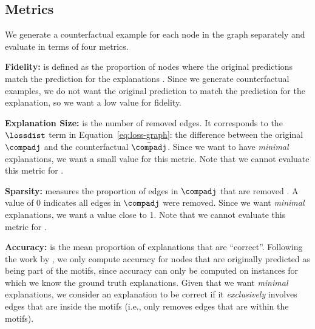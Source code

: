 \subsection{Metrics}
\label{section:cfgnn-metrics}
We generate a counterfactual example for each node in the graph separately and evaluate in terms of four metrics.

\medskip \noindent
\textbf{Fidelity:} is defined as the proportion of nodes where the original predictions match the prediction for the explanations \citep{molnar2019,ribeiro-2016-should}. Since we generate counterfactual examples, we do not want the original prediction to match the prediction for the explanation, so we want a low value for fidelity. 

\medskip \noindent
\textbf{Explanation Size:} is the number of removed edges. It corresponds to the $\lossdist$ term in Equation~\ref{eq:loss-graph}: the difference between the original $\compadj$ and the counterfactual $\bar{\compadj}$. Since we want to have \emph{minimal} explanations, we want a small value for this metric. Note that we cannot evaluate this metric for \gnnexplainer{}. 

\medskip \noindent
\textbf{Sparsity:} measures the proportion of edges in $\compadj$ that are removed \citep{yuan2020explainability}. A value of 0 indicates all edges in $\compadj$ were removed. Since we want \emph{minimal} explanations, we want a value close to 1. Note that we cannot evaluate this metric for \gnnexplainer{}.

\medskip \noindent
\textbf{Accuracy:} is the mean proportion of explanations that are ``correct''. Following the work by \citet{ying_gnnexplainer_2019, luo_parameterized_2020}, we only compute accuracy for nodes that are originally predicted as being part of the motifs, since accuracy can only be computed on instances for which we know the ground truth explanations. 
Given that we want \emph{minimal} explanations, we consider an explanation to be correct if it \emph{exclusively} involves edges that are inside the motifs (i.e., only removes edges that are within the motifs). 




